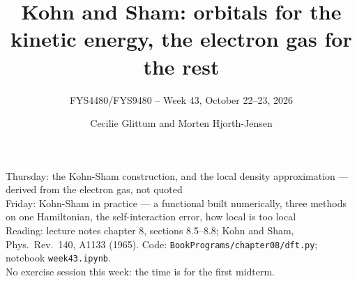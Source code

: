 \documentclass[aspectratio=169,10pt]{beamer}
\title{Kohn and Sham: orbitals for the kinetic energy, the electron gas for the rest}
\subtitle{FYS4480/FYS9480 -- Week 43, October 22--23, 2026}
\author{Cecilie Glittum and Morten Hjorth-Jensen}
\institute{Department of Physics,\\
University of Oslo, Norway}
\date{}
\begin{document}
\begin{frame}[plain]
  \vfill
  \begin{center}\small
  Thursday: the Kohn-Sham construction, and the local density approximation --- derived from the electron gas, not quoted\\
  Friday: Kohn-Sham in practice --- a functional built numerically, three methods on one Hamiltonian, the self-interaction error, how local is too local\\[0.8em]
  {\footnotesize Reading: lecture notes chapter 8, sections 8.5--8.8; Kohn and Sham, Phys.\ Rev.\ 140, A1133 (1965). Code: \texttt{BookPrograms/chapter08/dft.py}; notebook \texttt{week43.ipynb}.\\[0.2em]
  \alert{No exercise session this week: the time is for the first midterm.}}
  \end{center}
\end{frame}
\end{document}
